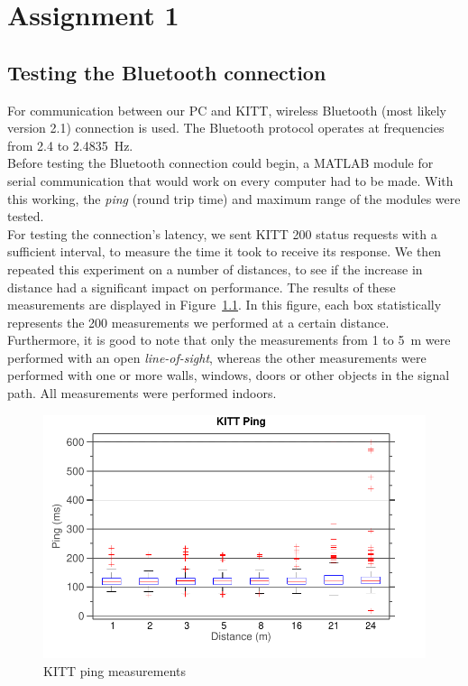 \documentclass[11pt,titlepage]{report}
\begin{document}
\chapter{Assignment 1}
\section{Testing the Bluetooth connection}
For communication between our PC and KITT, wireless Bluetooth (most likely version 2.1) connection is used. The Bluetooth protocol operates at frequencies from \num{2.4} to \SI{2.4835}{Hz}. \cite{bluetooth-specs}
\\
Before testing the Bluetooth connection could begin, a MATLAB module for serial communication that would work on every computer had to be made. With this working, the \textit{ping} (round trip time) and maximum range of the modules were tested.
\\
For testing the connection's latency, we sent KITT \num{200} status requests with a sufficient interval, to measure the time it took to receive its response. We then repeated this experiment on a number of distances, to see if the increase in distance had a significant impact on performance. The results of these measurements are displayed in Figure~\ref{fig:ass1-ping}. In this figure, each box statistically represents the \num{200} measurements we performed at a certain distance. Furthermore, it is good to note that only the measurements from \num{1} to \SI{5}{m} were performed with an open \textit{line-of-sight}, whereas the other measurements were performed with one or more walls, windows, doors or other objects in the signal path. All measurements were performed indoors.

\begin{figure}[H]
	\centering
	\includegraphics[width=0.8\linewidth]{resource/kitt-ping-rc.pdf}
	\caption{KITT ping measurements}
	\label{fig:ass1-ping}
\end{figure}
\end{document}
